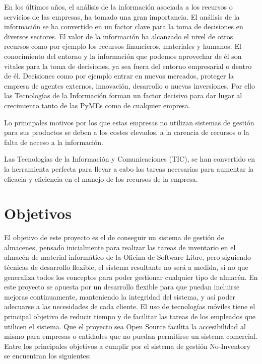 \documentclass[a4paper,11pt]{book}
\begin{document}
En los últimos años, el análisis de la información asociada a los recursos o servicios de las empresas, ha tomado una gran importancia. El análisis de la información se ha convertido en un factor clave para la toma de decisiones en diversos sectores. El valor de la información ha alcanzado el nivel de otros recursos como por ejemplo los recursos financieros, materiales y humanos. El conocimiento del entorno y la información que podemos aprovechar de él son vitales para la toma de decisiones, ya sea fuera del entorno empresarial o dentro de él. Decisiones como por ejemplo entrar en nuevos mercados, proteger la empresa de agentes externos, innovación, desarrollo o nuevas inversiones. Por ello las Tecnologías de la Información forman un factor decisivo para dar lugar al crecimiento tanto de las PyMEs como de cualquier empresa.

Lo principales motivos por los que estas empresas no utilizan sistemas de gestión para sus productos se deben a los costes elevados, a la carencia de recursos o la falta de acceso a la información. 

Las Tecnologías de la Información y Comunicaciones (TIC), se han convertido en la herramienta perfecta para llevar a cabo las tareas necesarias para aumentar la eficacia y eficiencia en el manejo de los recursos de la empresa.



\section{Objetivos}

El objetivo de este proyecto es el de conseguir un sistema de gestión de almacenes, pensado inicialmente para realizar las tareas de inventario en el almacén de material informático de la Oficina de Software Libre, pero siguiendo técnicas de desarrollo flexible, el sistema resultante no será a medida, si no que generaliza todos los conceptos para poder gestionar cualquier tipo de almacén.  En este proyecto se apuesta por un desarrollo flexible para que puedan incluirse mejoras continuamente, manteniendo la integridad del sistema, y así poder adecuarse a las necesidades de cada cliente. El uso de tecnologías móviles tiene el principal objetivo de reducir tiempo y de facilitar las tareas de los empleados que utilicen el sistema. Que el proyecto sea Open Source facilita la accesibilidad al mismo para empresas o entidades que no puedan permitirse un sistema comercial. Entre los principales objetivos a cumplir por el sistema de gestión No-Inventory se encuentran los siguientes:
\end{document}
